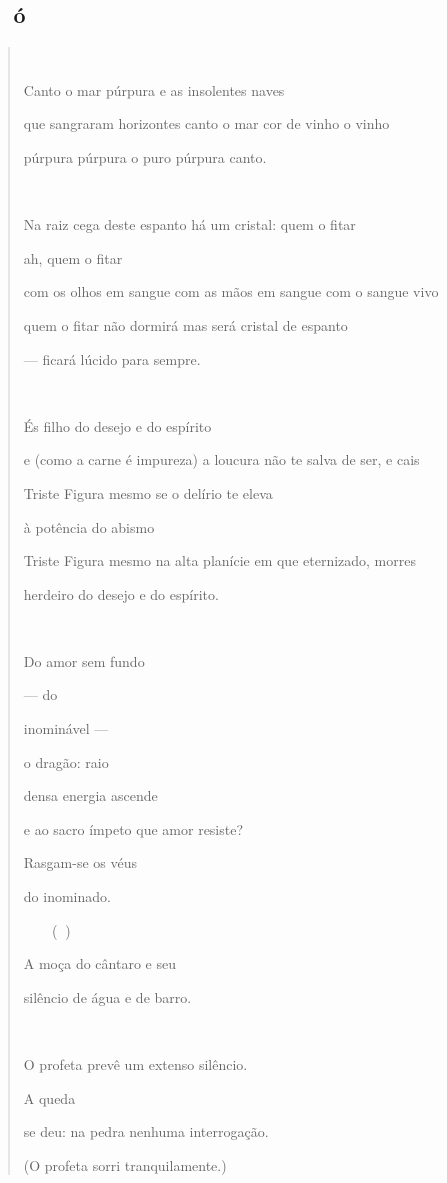 \subsection{ó}\label{section-7}

\begin{quote}


Canto o mar púrpura e as insolentes naves

que sangraram horizontes canto o mar cor de vinho o vinho

púrpura púrpura o puro púrpura canto.



Na raiz cega deste espanto há um cristal: quem o fitar

ah, quem o fitar

com os olhos em sangue com as mãos em sangue com o sangue vivo

quem o fitar não dormirá mas será cristal de espanto

--- ficará lúcido para sempre.

 

És filho do desejo e do espírito

e (como a carne é impureza) a loucura não te salva de ser, e cais

Triste Figura mesmo se o delírio te eleva

à potência do abismo

Triste Figura mesmo na alta planície em que eternizado, morres

herdeiro do desejo e do espírito.



Do amor sem fundo

--- do

inominável ---

o dragão: raio

densa energia ascende

e ao sacro ímpeto que amor resiste?

Rasgam-se os véus

do inominado.

 ()

A moça do cântaro e seu

silêncio de água e de barro.

 

O profeta prevê um extenso silêncio.

A queda

se deu: na pedra nenhuma interrogação.

(O profeta sorri tranquilamente.)


\end{quote}
